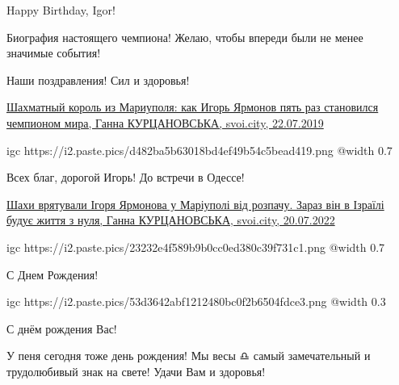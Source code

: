  
 
 
 
 

\qqSecCmt


Happy Birthday, Igor!


Биография настоящего чемпиона! Желаю, чтобы впереди были не менее значимые события!


Наши поздравления! Сил и здоровья!


\href{https://svoi.city/articles/37807/korol-shahmat-iz-mariupolya}{%
Шахматный король из Мариуполя: как Игорь Ярмонов пять раз становился чемпионом мира, %
Ганна КУРЦАНОВСЬКА, svoi.city, 22.07.2019%
}

\ifcmt
  igc https://i2.paste.pics/d482ba5b63018bd4ef49b54c5bead419.png
	@width 0.7
\fi


Всех благ, дорогой Игорь! До встречи в Одессе!


\href{https://svoi.city/articles/225184/shahist-z-mariupolya-igor-yarmonov-evakuyuvavsya-u-izrail}{%
Шахи врятували Ігоря Ярмонова у Маріуполі від розпачу. Зараз він в Ізраїлі будує життя з нуля, %
Ганна КУРЦАНОВСЬКА, svoi.city, 20.07.2022%
}

\ifcmt
  igc https://i2.paste.pics/23232e4f589b9b0cc0ed380c39f731c1.png
	@width 0.7
\fi


С Днем Рождения! 🙂


\ifcmt
  igc https://i2.paste.pics/53d3642abf1212480bc0f2b6504fdce3.png
	@width 0.3
\fi


С днём рождения Вас!


У пеня сегодня тоже день рождения! Мы весы ♎️ самый замечательный и
трудолюбивый знак на свете! Удачи Вам и здоровья!

